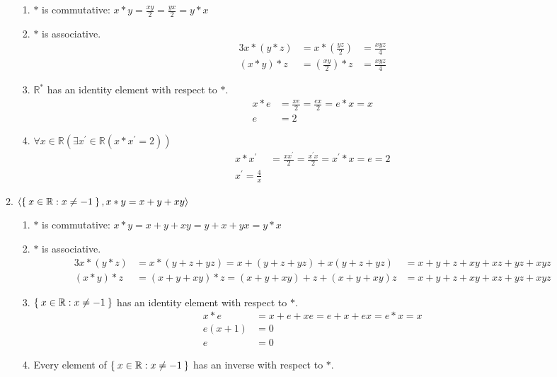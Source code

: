 \begin{enumerate}[label={\Alph*.},font={\bfseries}]
\begin{enumerate}[label={\arabic*},font={\bfseries}]
\begin{enumerate}[label={(\roman*)}]
          \item $*$ is commutative:
            $x*y=\frac{xy}{2} = \frac{yx}{2}=y*x$
          \item $*$ is associative.
            \begin{alignat*}{3}
              x*(y*z) &= x*(\frac{yz}{2}) &= \frac{xyz}{4} \\
              (x*y)*z &= (\frac{xy}{2})*z &= \frac{xyz}{4}
            \end{alignat*}
          \item $\mathbb{R}^*$ has an identity element with respect to $*$.
            \begin{align*}
              x*e &= \frac{xe}{2} = \frac{ex}{2}=e*x = x \\
              e &= 2
            \end{align*}
          \item $\forall x\in\mathbb{R}(\exists x^\prime\in\mathbb{R}(x*x^\prime=2))$
            \begin{align*}
              x*x^\prime &= \frac{xx^\prime}{2} = \frac{x^{\prime}x}{2} = x^{\prime}*x = e = 2 \\
              x^\prime = \frac{4}{x}
            \end{align*}
        \end{enumerate}
      \item $\langle\Set{x\in\mathbb{R} : x \neq -1}, x*y=x+y+xy\rangle$
        \begin{enumerate}[label={(\roman*)}]
          \item $*$ is commutative: $x*y=x+y+xy = y+x+yx=y*x$
          \item $*$ is associative.
            \begin{alignat*}{3}
              x*(y*z) &= x*(y+z+yz) = x+(y+z+yz)+x(y+z+yz) &= x+y+z+xy+xz+yz+xyz \\
              (x*y)*z &= (x+y+xy)*z = (x+y+xy)+z+(x+y+xy)z &= x+y+z+xy+xz+yz+xyz
            \end{alignat*}
          \item $\Set{x\in\mathbb{R} : x \neq -1}$ has an identity element with respect to $*$.
            \begin{align*}
              x*e &= x+e+xe = e+x+ex = e*x = x \\
              e(x+1) &= 0 \\
              e &= 0
            \end{align*}
          \item Every element of $\Set{x\in\mathbb{R} : x \neq -1}$ has an inverse with respect to $*$.

\end{enumerate}
\end{enumerate}
\end{enumerate}
